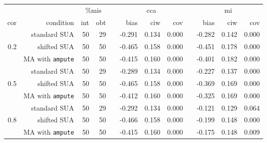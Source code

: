\documentclass[11pt,a4paper]{article}
\newcommand{\code}[1]{\texttt{#1}}
\begin{document}
\begin{table}[h!]
\bigskip
\begin{subtable}{1\textwidth}
\vspace{3mm}
\centering
\captionsetup{justification=justified,singlelinecheck=false,width = 0.93\textwidth}
  \label{sim2b}
\begin{tabular}{rrrrrrrrrrrr}
\hline
&& \multicolumn{2}{c}{\%mis} && \multicolumn{3}{c}{cca} && \multicolumn{3}{c}{mi} \\
\cline{3-4} \cline{6-8} \cline{10-12}
cor & condition & int & obt & & bias & ciw & cov & & bias & ciw & cov \\ 
\hline
 & standard SUA & 50 & 29 &  & -0.291 & 0.134 & 0.000 &  & -0.282 & 0.142 & 0.000 \\ 
  0.2 & shifted SUA & 50 & 50 &  & -0.465 & 0.158 & 0.000 &  & -0.451 & 0.178 & 0.000 \\ 
   & MA with \code{ampute} & 50 & 50 &  & -0.415 & 0.160 & 0.000 &  & -0.401 & 0.182 & 0.000 \\ 
   \cline{2-12}
   & standard SUA & 50 & 29 &  & -0.289 & 0.134 & 0.000 &  & -0.227 & 0.137 & 0.000 \\ 
  0.5 & shifted SUA & 50 & 50 &  & -0.465 & 0.158 & 0.000 &  & -0.369 & 0.169 & 0.000 \\ 
   & MA with \code{ampute} & 50 & 50 &  & -0.412 & 0.160 & 0.000 &  & -0.325 & 0.169 & 0.000 \\ 
   \cline{2-12}
   & standard SUA & 50 & 29 &  & -0.292 & 0.134 & 0.000 &  & -0.121 & 0.129 & 0.064 \\ 
  0.8 & shifted SUA & 50 & 50 &  & -0.466 & 0.158 & 0.000 &  & -0.199 & 0.148 & 0.000 \\ 
   & MA with \code{ampute} & 50 & 50 &  & -0.415 & 0.160 & 0.000 &  & -0.175 & 0.148 & 0.009 \\ 
   \hline
\end{tabular}
\vspace{2mm}
\captionsetup{justification=justified,singlelinecheck=false,width = 0.93\textwidth}
  \end{subtable}

\end{table}
\end{document}
